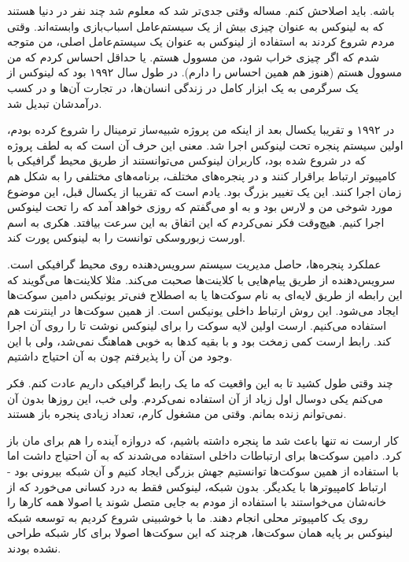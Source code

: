 باشه. باید اصلاحش کنم. مساله وقتی جدی‌تر شد که معلوم شد چند نفر در دنیا
هستند که به لینوکس به عنوان چیزی بیش از یک سیستم‌عامل اسباب‌بازی
وابسته‌اند. وقتی مردم شروع کردند به استفاده از لینوکس به عنوان یک
سیستم‌عامل اصلی، من متوجه شدم که اگر چیزی خراب شود، من مسوول هستم. یا
حداقل احساس کردم که من مسوول هستم (هنوز هم همین احساس را دارم). در طول
سال ۱۹۹۲ بود که لینوکس از یک سرگرمی به یک ابزار کامل در زندگی انسان‌ها،
در تجارت آن‌ها و در کسب درآمدشان تبدیل شد.

در ۱۹۹۲ و تقریبا یکسال بعد از اینکه من پروژه شبیه‌ساز ترمینال را شروع
کرده بودم، اولین سیستم پنجره  تحت لینوکس اجرا شد. معنی این حرف
آن است که به لطف پروژه  که در  شروع شده بود، کاربران
لینوکس می‌توانستند از طریق محیط گرافیکی با کامپیوتر ارتباط براقرار کنند
و در پنجره‌های مختلف، برنامه‌های مختلفی را به شکل هم زمان اجرا کنند. این
یک تغییر بزرگ بود. یادم است که تقریبا از یکسال قبل، این موضوع مورد
شوخی من و لارس بود و به او می‌گفتم که روزی خواهد آمد که  را تحت
لینوکس اجرا کنیم. هیچ‌وقت فکر نمی‌کردم که این اتفاق به این سرعت
بیافتد. هکری به اسم اورست زبوروسکی توانست
 را به لینوکس پورت کند.

عملکرد پنجره‌ها، حاصل مدیریت سیستم سرویس‌دهنده  روی محیط گرافیکی
است. سرویس‌دهنده از طریق پیام‌هایی با کلاینت‌ها صحبت می‌کند. مثلا کلاینت‌ها
می‌گویند که  این رابطه از
طریق لایه‌ای به نام سوکت‌ها یا به اصطلاح فنی‌تر یونیکس دامین سوکت‌ها ایجاد
می‌شود. این روش ارتباط داخلی یونیکس است. از همین سوکت‌ها در اینترنت هم
استفاده می‌کنیم. ارست اولین لایه سوکت را برای لینوکس نوشت تا 
را روی آن اجرا کند. رابط ارست کمی زمخت بود و با بقیه کدها به خوبی
هماهنگ نمی‌شد، ولی با این وجود من آن را پذیرفتم چون به آن احتیاج
داشتیم.

چند وقتی طول کشید تا به این واقعیت که ما یک رابط گرافیکی داریم عادت
کنم. فکر می‌کنم یکی دوسال اول زیاد از آن استفاده نمی‌کردم. ولی خب، این
روزها بدون آن نمی‌توانم زنده بمانم. وقتی من مشغول کارم، تعداد زیادی
پنجره باز هستند.

کار ارست نه تنها باعث شد ما پنجره داشته باشیم، که دروازه آینده را هم
برای مان باز کرد. دامین سوکت‌ها برای ارتباطات داخلی استفاده می‌شدند که
 به آن احتیاج داشت اما با استفاده از همین سوکت‌ها توانستیم جهش
بزرگی ایجاد کنیم و آن شبکه بیرونی بود - ارتباط کامپیوترها با
یکدیگر. بدون شبکه، لینوکس فقط به درد کسانی می‌خورد که از خانه‌شان
می‌خواستند با استفاده از مودم به جایی متصل شوند یا اصولا همه کارها را
روی یک کامپیوتر محلی انجام دهند. ما با خوشبینی شروع کردیم به توسعه
شبکه لینوکس بر پایه همان سوکت‌ها، هرچند که این سوکت‌ها اصولا برای کار
شبکه طراحی نشده بودند.

